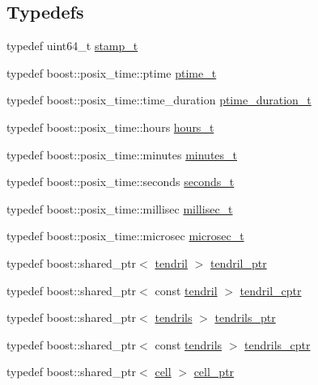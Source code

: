 \subsection*{Typedefs}
\begin{DoxyCompactItemize}
\item 
typedef uint64\+\_\+t \hyperlink{namespaceecto_a96ba8fa498cc4b8e2a0217a9e236b50d}{stamp\+\_\+t}
\item 
typedef boost\+::posix\+\_\+time\+::ptime \hyperlink{namespaceecto_a5bbe8fb0da047cb18d92eb9dfb469652}{ptime\+\_\+t}
\item 
typedef boost\+::posix\+\_\+time\+::time\+\_\+duration \hyperlink{namespaceecto_a0952d5ebd059cbd79b978ecab9ec781c}{ptime\+\_\+duration\+\_\+t}
\item 
typedef boost\+::posix\+\_\+time\+::hours \hyperlink{namespaceecto_a477c167c1e1288b689db5872f650540e}{hours\+\_\+t}
\item 
typedef boost\+::posix\+\_\+time\+::minutes \hyperlink{namespaceecto_ad57e5ebf1455dd895ce11804e47669e5}{minutes\+\_\+t}
\item 
typedef boost\+::posix\+\_\+time\+::seconds \hyperlink{namespaceecto_ae14f91b3661ad9cb774590b15407742c}{seconds\+\_\+t}
\item 
typedef boost\+::posix\+\_\+time\+::millisec \hyperlink{namespaceecto_ab1f4721cc3b311f9615b3092d291260b}{millisec\+\_\+t}
\item 
typedef boost\+::posix\+\_\+time\+::microsec \hyperlink{namespaceecto_affe36dc8be6d20a6b8f7359655c8dc23}{microsec\+\_\+t}
\item 
typedef boost\+::shared\+\_\+ptr$<$ \hyperlink{classecto_1_1tendril}{tendril} $>$ \hyperlink{namespaceecto_a84fb5f6130275382e5cbeb5fdececa78}{tendril\+\_\+ptr}
\item 
typedef boost\+::shared\+\_\+ptr$<$ const \hyperlink{classecto_1_1tendril}{tendril} $>$ \hyperlink{namespaceecto_ad01f26ee47597f71a6f86ee34bb3ffe4}{tendril\+\_\+cptr}
\item 
typedef boost\+::shared\+\_\+ptr$<$ \hyperlink{classecto_1_1tendrils}{tendrils} $>$ \hyperlink{namespaceecto_a89953a225525948cb71d5488c3c6472b}{tendrils\+\_\+ptr}
\item 
typedef boost\+::shared\+\_\+ptr$<$ const \hyperlink{classecto_1_1tendrils}{tendrils} $>$ \hyperlink{namespaceecto_a6165b23b34082cfc17104ca7e9f1b212}{tendrils\+\_\+cptr}
\item 
typedef boost\+::shared\+\_\+ptr$<$ \hyperlink{structecto_1_1cell}{cell} $>$ \hyperlink{namespaceecto_aed1809e82b9229ea81ef9ee3438cf62c}{cell\+\_\+ptr}

\end{DoxyCompactItemize}
